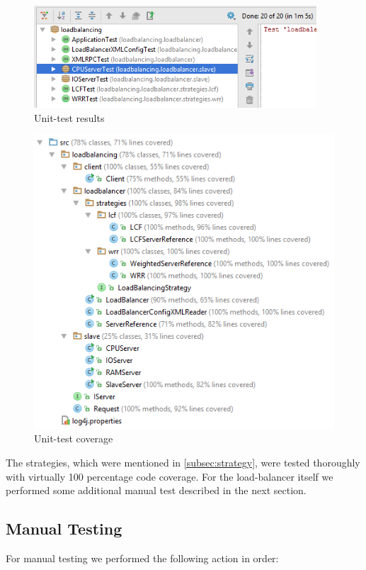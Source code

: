 \documentclass[11pt, a4paper]{article}
\begin{document}
\begin{figure}[H]
	\centering
	\includegraphics[height=1.5in]{img/tests}
	\caption{Unit-test results}
\end{figure}
\begin{figure}[H]
	\centering
	\includegraphics{img/coverage}
	\caption{Unit-test coverage}
\end{figure}

The strategies, which were mentioned in \ref{subsec:strategy}, were tested thoroughly with virtually 100 percentage code coverage.
For the load-balancer itself we performed some additional manual test described in the next section.

\subsection{Manual Testing}

For manual testing we performed the following action in order:
\end{document}
